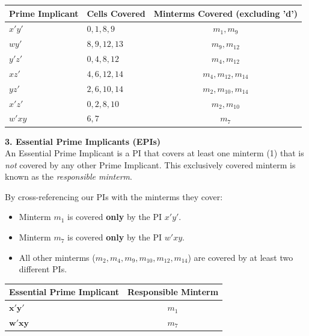 \documentclass[12pt,a3paper]{article}
\begin{document}
\begin{enumerate}
\begin{tcolorbox}[enhanced,breakable,ansbox,colback=cC!4,colframe=cC,boxrule=0.8pt,arc=5pt,title={\textbf{Answer}},fonttitle=\bfseries\color{white},colbacktitle=cC]
\begin{center}
\begin{tabular}{llc}
    \toprule
    \textbf{Prime Implicant} & \textbf{Cells Covered} & \textbf{Minterms Covered (excluding 'd')} \\
    \midrule
    $x'y'$ & $0, 1, 8, 9$ & $m_1, m_9$ \\
    $wy'$  & $8, 9, 12, 13$ & $m_9, m_{12}$ \\
    $y'z'$ & $0, 4, 8, 12$ & $m_4, m_{12}$ \\
    $xz'$  & $4, 6, 12, 14$ & $m_4, m_{12}, m_{14}$ \\
    $yz'$  & $2, 6, 10, 14$ & $m_2, m_{10}, m_{14}$ \\
    $x'z'$ & $0, 2, 8, 10$ & $m_2, m_{10}$ \\
    $w'xy$ & $6, 7$ & $m_7$ \\
    \bottomrule
\end{tabular}
\end{center}

\vspace{0.3cm}
\textbf{3. Essential Prime Implicants (EPIs)} \\
An Essential Prime Implicant is a PI that covers at least one minterm (1) that is \textit{not} covered by any other Prime Implicant. This exclusively covered minterm is known as the \textit{responsible minterm}.

By cross-referencing our PIs with the minterms they cover:
\begin{itemize}
    \item Minterm $m_1$ is covered \textbf{only} by the PI $x'y'$.
    \item Minterm $m_7$ is covered \textbf{only} by the PI $w'xy$.
    \item All other minterms ($m_2, m_4, m_9, m_{10}, m_{12}, m_{14}$) are covered by at least two different PIs.
\end{itemize}

\begin{center}
\begin{tabular}{lc}
    \toprule
    \textbf{Essential Prime Implicant} & \textbf{Responsible Minterm} \\
    \midrule
    \textcolor{cC}{$\mathbf{x'y'}$} & $m_1$ \\
    \textcolor{cC}{$\mathbf{w'xy}$} & $m_7$ \\
    \bottomrule
\end{tabular}
\end{center}


\end{tcolorbox}
\end{enumerate}
\end{document}
